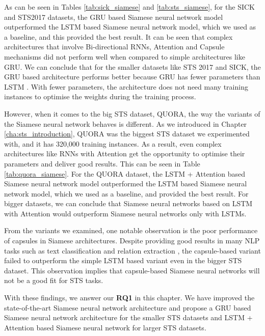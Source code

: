 As can be seen in Tables \ref{tab:sick_siamese} and \ref{tab:sts_siamese}, for the SICK and STS2017 datasets, the GRU based Siamese neural network model outperformed the LSTM based Siamese neural network model, which we used as a baseline, and this provided the best result. It can be seen that complex architectures that involve Bi-directional RNNs, Attention and Capsule mechanisms did not perform well when compared to simple architectures like GRU. We can conclude that for the smaller datasets like STS 2017 and SICK, the GRU based architecture performs better because GRU has fewer parameters than LSTM \autocite{Chung2014EmpiricalEO}. With fewer parameters, the architecture does not need many training instances to optimise the weights during the training process.

However, when it comes to the big STS dataset, QUORA, the way the variants of the Siamese neural network behaves is different. As we introduced in Chapter \ref{cha:sts_introduction}, QUORA was the biggest STS dataset we experimented with, and it has 320,000 training instances. As a result, even complex architectures like RNNs with Attention get the opportunity to optimise their parameters and deliver good results. This can be seen in Table \ref{tab:quora_siamese}. For the QUORA dataset, the LSTM + Attention based Siamese neural network model outperformed the LSTM based Siamese neural network model, which we used as a baseline, and provided the best result. For bigger datasets, we can conclude that Siamese neural networks based on LSTM with Attention would outperform Siamese neural networks only with LSTMs. 

From the variants we examined, one notable observation is the poor performance of capsules in Siamese architectures. Despite providing good results in many NLP tasks such as text classification \autocite{NIPS2017_2cad8fa4,hettiarachchi-ranasinghe-2019-emoji, xia-etal-2018-zero, srivastava-etal-2018-identifying} and relation extraction \autocite{Zhang_Li_Jia_Zhao_2019, zhang-etal-2018-attention, 9095302}, the capsule-based variant failed to outperform the simple LSTM based variant even in the bigger STS dataset. This observation implies that capsule-based Siamese neural networks will not be a good fit for STS tasks.

With these findings, we answer our \textbf{RQ1} in this chapter. We have improved the state-of-the-art Siamese neural network architecture and propose a GRU based Siamese neural network architecture for the smaller STS datasets and LSTM + Attention based Siamese neural network for larger STS datasets.

